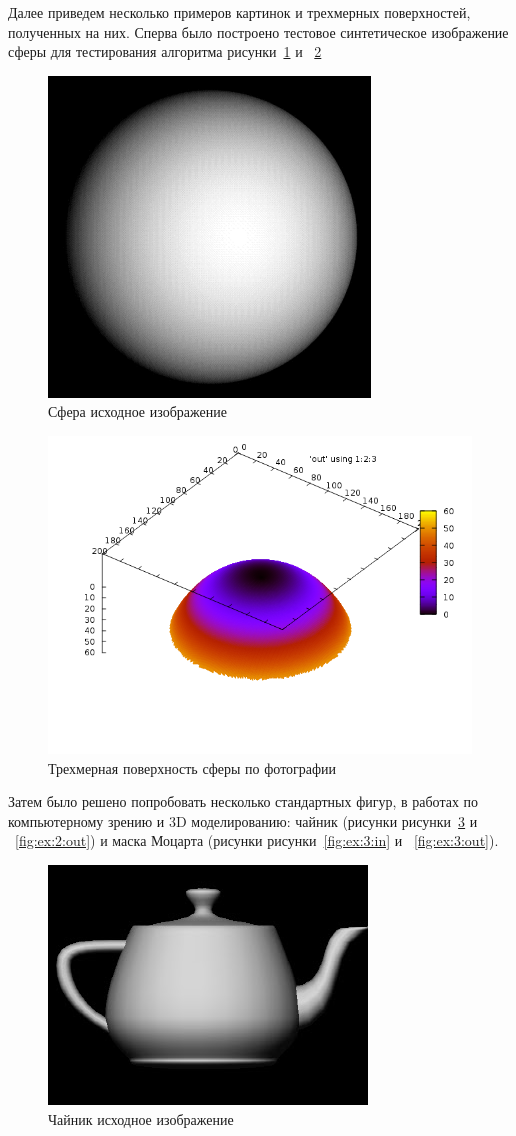Далее приведем несколько примеров картинок и трехмерных поверхностей,
полученных на них. Сперва было построено тестовое синтетическое
изображение сферы для тестирования алгоритма рисунки~\ref{fig:ex:1:in} 
и ~\ref{fig:ex:1:out}

\begin{figure}[H]
  \centering
  \includegraphics[width=0.5\linewidth]{img/sphere_in.png}
  \hfil \caption{Сфера исходное изображение}
  \label{fig:ex:1:in}
\end{figure}

\begin{figure}[H]
  \centering
  \includegraphics[width=0.5\linewidth]{img/sphere.png}
  \hfil \caption{Трехмерная поверхность сферы по фотографии}
  \label{fig:ex:1:out}
\end{figure}

Затем было решено попробовать несколько стандартных фигур, в работах
по компьютерному зрению и 3D моделированию: чайник (рисунки рисунки~\ref{fig:ex:2:in} 
и ~\ref{fig:ex:2:out}) и маска Моцарта (рисунки рисунки~\ref{fig:ex:3:in} 
и ~\ref{fig:ex:3:out}).

\begin{figure}[H]
  \centering
  \includegraphics[width=0.5\linewidth]{img/teapot_in.jpg}
  \hfil \caption{Чайник исходное изображение}
  \label{fig:ex:2:in}
\end{figure}

